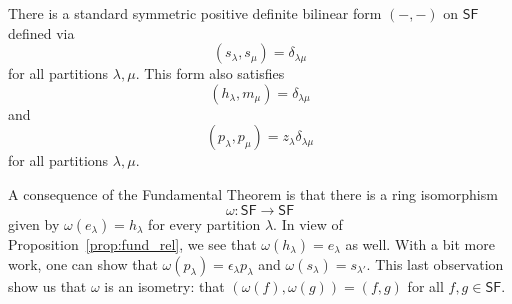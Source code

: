 \documentclass[12pt]{article}
\theoremstyle{plain}
\theoremstyle{definition}
\theoremstyle{remark}
\numberwithin{equation}{section}
\begin{document}
There is a standard symmetric positive definite bilinear form $(-,-)$
on $\mathsf{SF}$ defined via
\[
( s_\lambda, s_\mu ) = \delta_{\lambda \mu}
\]
for all partitions $\lambda, \mu$.
This form also satisfies
\[
( h_\lambda, m_\mu ) = \delta_{\lambda \mu}
\]
and
\[
( p_\lambda, p_\mu ) = z_\lambda \delta_{\lambda \mu}
\]
for all partitions $\lambda, \mu$.

A consequence of the Fundamental Theorem is that there is a ring
isomorphism
\[
\omega : \mathsf{SF} \to \mathsf{SF}
\]
given by $\omega(e_\lambda)=h_\lambda$ for every partition $\lambda$.
In view of Proposition~\ref{prop:fund_rel}, we see that
$\omega(h_\lambda)=e_\lambda$ as well.
With a bit more work, one can show that
$\omega(p_\lambda)=\epsilon_\lambda p_\lambda$
and
$\omega(s_\lambda)=s_{\lambda'}$.
This last observation show us that $\omega$ is an isometry:
that $( \omega(f), \omega(g) ) = (f, g)$ for
all $f,g \in \mathsf{SF}$.



\end{document}
